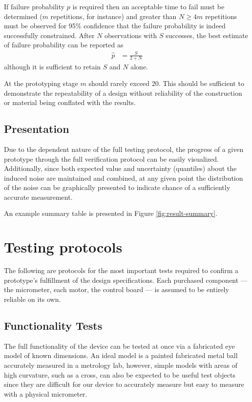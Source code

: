 \documentclass{article}
\begin{document}
If failure probability $p$ is required then an acceptable time to fail must be determined ($m$ repetitions, for instance) and greater than $N \ge 4m$ repetitions must be observed for 95\% confidence that the failure probability is indeed successfully constrained. After $N$ observations with $S$ successes, the best estimate of failure probability can be reported as
\begin{align}
  \hat{p} &= \frac{S}{2 + N}
\end{align}
although it is sufficient to retain $S$ and $N$ alone.

At the prototyping stage $m$ should rarely exceed 20. This should be sufficient to demonstrate the repeatability of a design without reliability of the construction or material being conflated with the results.

\subsection{Presentation}
\label{sec:presentation}

Due to the dependent nature of the full testing protocol, the progress of a given prototype through the full verification protocol can be easily visualized. Additionally, since both expected value and uncertainty (quantiles) about the induced noise are maintained and combined, at any given point the distribution of the noise can be graphically presented to indicate chance of a sufficiently accurate measurement.

An example summary table is presented in Figure
\ref{fig:result-summary}.

\section{Testing protocols}
\label{sec:protocols}

The following are protocols for the most important tests required to confirm a prototype's fulfillment of the design specifications. Each purchased component --- the micrometer, each motor, the control board --- is assumed to be entirely reliable on its own. 

\subsection{Functionality Tests}
\label{sec:functional-tests}

The full functionality of the device can be tested at once via a fabricated eye model of known dimensions. An ideal model is a painted fabricated metal ball accurately measured in a metrology lab, however, simple models with areas of high curvature, such as a cross, can also be expected to be useful test objects since they are difficult for our device to accurately measure but easy to measure with a physical micrometer.
\end{document}
